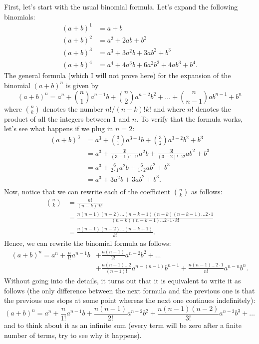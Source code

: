 \documentclass{article}
\theoremstyle{plain}
\theoremstyle{definition}
\begin{document}
First, let's start with the usual binomial formula. Let's expand the following binomials:
\begin{align*}
    (a+b)^1 &= a + b \\
    (a+b)^2 &= a^2 + 2ab + b^2 \\
    (a+b)^3 &= a^3 + 3a^2b + 3ab^2 + b^3 \\
    (a+b)^4 &= a^4 + 4a^3b + 6a^2b^2 + 4ab^3 + b^4.
\end{align*}
The general formula (which I will not prove here) for the expansion of the binomial $(a+b)^n$ is given by
$$(a+b)^n = a^n + \binom{n}{1}a^{n-1}b + \binom{n}{2}a^{n-2}b^2 + \dots + \binom{n}{n-1}ab^{n-1} + b^n$$
where $\binom{n}{k}$ denotes the number $n!/(n-k)!k!$ and where $n!$ denotes the product of all the integers between 1 and $n$. To verify that the formula works, let's see what happens if we plug in $n = 2$:
\begin{align*}
    (a+b)^3 &= a^3 + \binom{3}{1}a^{3-1}b + \binom{3}{2}a^{3-2}b^2 + b^3 \\
    &= a^3 + \frac{3!}{(3-1)!\cdot 1!}a^2b + \frac{3!}{(3-2)!\cdot 2!}ab^2 + b^3 \\ 
    &= a^3 + \frac{6}{2\cdot 1}a^2b + \frac{6}{1\cdot 2}ab^2 + b^3 \\ 
    &= a^3 + 3a^2b + 3ab^2 + b^3. \\ 
\end{align*}
Now, notice that we can rewrite each of the coefficient $\binom{n}{k}$ as follows:
\begin{align*}
    \binom{n}{k} &= \frac{n!}{(n-k)!k!} \\
    &= \frac{n(n-1)(n-2)\dots (n-k+1)(n-k)(n-k -1)\dots 2\cdot 1}{(n-k)(n-k -1)\dots 2\cdot 1 \cdot k!} \\
    &= \frac{n(n-1)(n-2)\dots (n-k+1)}{k!}.
\end{align*}
Hence, we can rewrite the binomial formula as follows:
\begin{align*}
    (a+b)^n = a^n + \frac{n}{1!}a^{n-1}b &+ \frac{n(n-1)}{2!}a^{n-2}b^2 + \dots \\
    &+ \frac{n(n-1)\dots2}{(n-1)!}a^{n-(n-1)}b^{n-1} + \frac{n(n-1)\dots2 \cdot 1}{n!}a^{n-n}b^{n}.
\end{align*}
Without going into the details, it turns out that it is equivalent to write it as follows (the only difference between the next formula and the previous one is that the previous one stops at some point whereas the next one continues indefinitely):
$$(a+b)^n = a^n + \frac{n}{1!}a^{n-1}b + \frac{n(n-1)}{2!}a^{n-2}b^2 + \frac{n(n-1)(n-2)}{3!}a^{n-3}b^3 + \dots$$
and to think about it as an infinite sum (every term will be zero after a finite number of terms, try to see why it happens).
\end{document}
